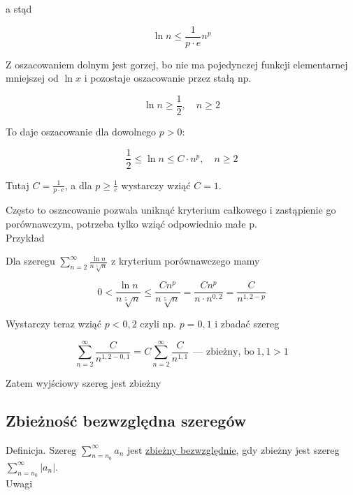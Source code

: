 a stąd

$$ \ln n \leq \frac{1}{p \cdot e} n^p $$

Z oszacowaniem dolnym jest gorzej, bo nie ma pojedynczej funkcji elementarnej mniejszej od $\ln x$ i pozostaje oszacowanie
przez stałą np.

$$ \ln n \geq \frac{1}{2}, \quad n \geq 2  $$

To daje oszacowanie dla dowolnego $p>0$:

$$ \frac{1}{2} \leq \ln n \leq C \cdot n^p, \quad n \geq 2 $$

Tutaj $ C = \frac{1}{p \cdot e} $, a dla $ p \geq \frac{1}{e} $ wystarczy wziąć $C = 1$.

Często to oszacowanie pozwala uniknąć kryterium całkowego i zastąpienie go porównawczym, potrzeba tylko wziąć
odpowiednio małe p. \\

Przykład

Dla szeregu $ \sum\limits_{n = 2}^{\infty} \frac{\ln n}{n \sqrt[5]{n}} $ z kryterium porównawczego mamy

$$ 0 < \frac{\ln n}{n \sqrt[5]{n}} \leq \frac{Cn^p}{n \sqrt[5]{n}} = \frac{Cn^p}{n \cdot n^{0,2}} = \frac{C}{n^{1,2 - p}} $$

Wystarczy teraz wziąć $p < 0,2$ czyli np. $p = 0,1$ i zbadać szereg

$$ \sum\limits_{n=2}^{\infty} \frac{C}{n^{1,2 - 0,1}} = C \sum\limits_{n=2}^{\infty} \frac{C}{n^{1,1}} 
\ \ \textrm{--- zbieżny, bo} \ 1,1 > 1$$

Zatem wyjściowy szereg jest zbieżny


\subsection*{Zbieżność bezwzględna szeregów}

Definicja. Szereg $ \sum\limits_{n=n_0}^{\infty} a_n$ jest \underline{zbieżny bezwzględnie}, gdy zbieżny jest szereg
$ \sum\limits_{n=n_0}^{\infty} |a_n|$. \\

Uwagi

